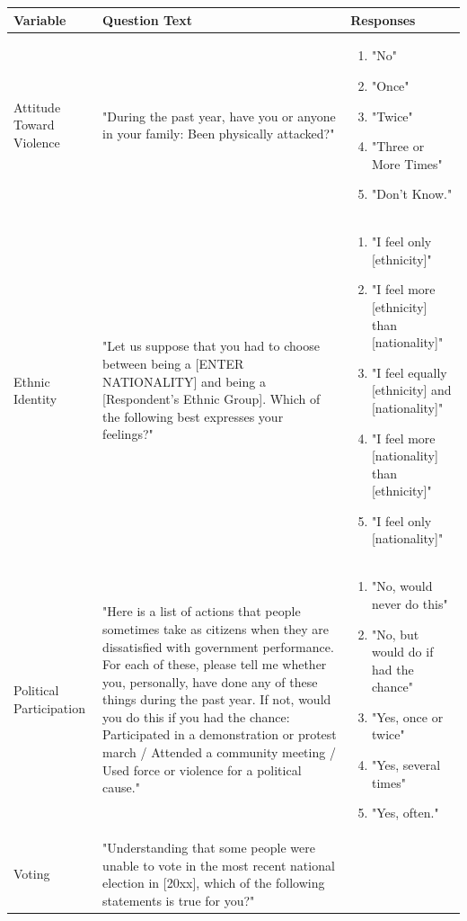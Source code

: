 \documentclass[12pt,]{book}
\theoremstyle{definition}
\theoremstyle{definition}
\theoremstyle{definition}
\theoremstyle{remark}
\begin{document}
\singlespacing

\begin{longtable}{p{3cm} p{6cm} p{6cm}}
Variable & Question Text & Responses \\
\hline
Attitude Toward Violence & "During the past year, have you or anyone in your family: Been physically attacked?" & \begin{enumerate}
\item "No"
\item "Once"
\item "Twice"
\item "Three or More Times"
\item "Don't Know."
\end{enumerate} \\
\hline
Ethnic Identity & "Let us suppose that you had to choose between being a [ENTER NATIONALITY] and being a [Respondent’s Ethnic Group]. Which of the following best expresses your feelings?" & \begin{enumerate}
\item "I feel only [ethnicity]"
\item "I feel more [ethnicity] than [nationality]"
\item"I feel equally [ethnicity] and [nationality]"
\item "I feel more [nationality] than [ethnicity]"
\item "I feel only [nationality]"
\end{enumerate} \\
\hline
Political Participation & "Here is a list of actions that people sometimes take as citizens when they are dissatisfied with government performance. For each of these, please tell me whether you, personally, have done any of these things during the past year. If not, would you do this if you had the chance: Participated in a demonstration or protest march / Attended a community meeting / Used force or violence for a political cause." & \begin{enumerate}
\item "No, would never do this"
\item "No, but would do if had the chance"
\item "Yes, once or twice"
\item "Yes, several times"
\item "Yes, often."
\end{enumerate} \\
\hline
Voting & "Understanding that some people were unable to vote in the most recent national election in [20xx], which of the following statements is true for you?" & \begin{enumerate}

\end{enumerate}
\end{longtable}
\end{document}
